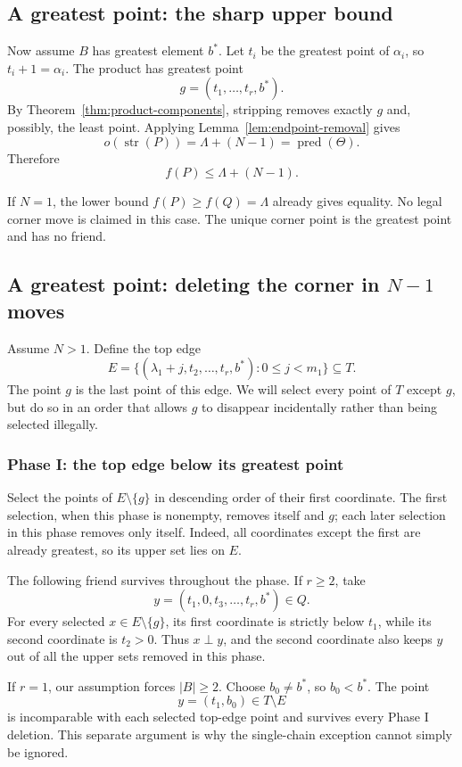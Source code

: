 \documentclass[11pt,letterpaper]{article}
\theoremstyle{definition}
\theoremstyle{remark}
\newcommand{\str}{\operatorname{str}}
\newcommand{\pred}{\operatorname{pred}}
\begin{document}
\subsection{A greatest point: the sharp upper bound}
Now assume $B$ has greatest element $b^*$. Let $t_i$ be the greatest point
of $\alpha_i$, so $t_i+1=\alpha_i$. The product has greatest point
\[
 g=(t_1,\ldots,t_r,b^*).
\]
By Theorem~\ref{thm:product-components}, stripping removes exactly $g$ and,
possibly, the least point. Applying Lemma~\ref{lem:endpoint-removal} gives
\[
 o(\str(P))=\Lambda+(N-1)=\pred(\Theta).
\]
Therefore
\begin{equation}\label{eq:mixed-top-upper}
 f(P)\le\Lambda+(N-1).
\end{equation}

If $N=1$, the lower bound $f(P)\ge f(Q)=\Lambda$ already gives equality.
No legal corner move is claimed in this case. The unique corner point is
the greatest point and has no friend.

\subsection{A greatest point: deleting the corner in $N-1$ moves}
Assume $N>1$. Define the top edge
\[
 E=\{(\lambda_1+j,t_2,\ldots,t_r,b^*):0\le j<m_1\}\subseteq T.
\]
The point $g$ is the last point of this edge. We will select every point
of $T$ except $g$, but do so in an order that allows $g$ to disappear
incidentally rather than being selected illegally.

\subsubsection{Phase I: the top edge below its greatest point}
Select the points of $E\setminus\{g\}$ in descending order of their
first coordinate. The first selection, when this phase is nonempty,
removes itself and $g$; each later selection in this phase removes only
itself. Indeed, all coordinates except the first are already greatest,
so its upper set lies on $E$.

The following friend survives throughout the phase. If $r\ge2$, take
\[
 y=(t_1,0,t_3,\ldots,t_r,b^*)\in Q.
\]
For every selected $x\in E\setminus\{g\}$, its first coordinate is
strictly below $t_1$, while its second coordinate is $t_2>0$. Thus
$x\perp y$, and the second coordinate also keeps $y$ out of all the upper
sets removed in this phase.

If $r=1$, our assumption forces $|B|\ge2$. Choose $b_0\ne b^*$, so
$b_0<b^*$. The point
\[
 y=(t_1,b_0)\in T\setminus E
\]
is incomparable with each selected top-edge point and survives every
Phase I deletion. This separate argument is why the single-chain
exception cannot simply be ignored.
\end{document}
